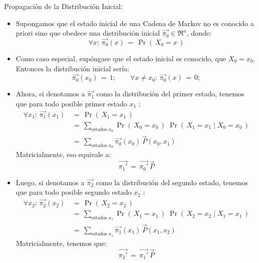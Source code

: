 \documentclass[ 10pt, xcolor = dvipsnames]{beamer}
\begin{document}
\begin{frame}[allowframebreaks]
\frametitle{\insertsubsection}

Propagaci\'on de la Distribuci\'on Inicial: 
\begin{itemize}
\item Supongamos que el estado inicial de una Cadena de Markov no es conocido \linebreak a priori sino que obedece una distribuci\'on inicial $\vec{\pi_0} \in \Re^n$, donde: 
\[
\forall x \colon \, \vec{\pi_0}(x) \, = \, \Pr( \, X_0 = x \, )
\]
\item Como caso especial, sup\'ongase que el estado inicial es conocido, \eg \linebreak que $X_0 = x_0$. Entonces la distribuci\'on inicial ser\'ia: 
\[
\vec{\pi_0}(x_0) \, = \, 1; \qquad
\forall x \neq x_0 \colon \, \vec{\pi_0}(x) \, = \, 0;
\]
\end{itemize}
\framebreak

\begin{itemize}
\item Ahora, si denotamos a $\vec{\pi_1}$ como la distribuci\'on del primer estado, \linebreak tenemos que para todo posible primer estado $x_1$ :
\begin{align*}
\forall x_1 \colon \, \vec{\pi_1}(x_1) \, 
& = \, \Pr( \, X_1 = x_1 \, ) \\[1ex]
& = \, \sum_{\text{estados } x_0} \Pr( \, X_0 = x_0 \, ) \; \Pr( \, X_1 = x_1 \mid X_0 = x_0 \, ) \\[1ex]
& = \, \sum_{\text{estados } x_0} \vec{\pi_0}(x_0) \, \vec{P}(x_0,x_1)
\end{align*}
Matricialmente, eso equivale a: 
\[
\vec{\pi_1'} \, = \, \vec{\pi_0'} \, \vec{P}
\]
\end{itemize}
\framebreak

\begin{itemize}
\item Luego, si denotamos a $\vec{\pi_2}$ como la distribuci\'on del segundo estado, \linebreak tenemos que para todo posible segundo estado $x_2$ :
\begin{align*}
\forall x_2 \colon \, \vec{\pi_2}(x_2) \,
& = \, \Pr( \, X_2 = x_2 \, ) \\[1ex]
& = \, \sum_{\text{estados } x_1} \Pr( \, X_1 = x_1 \, ) \; \Pr( \, X_2 = x_2 \mid X_1 = x_1 \, ) \\[1ex]
& = \, \sum_{\text{estados } x_1} \vec{\pi_1}(x_1) \, \vec{P}(x_1,x_2)
\end{align*}
Matricialmente, tenemos que: 
\[
\vec{\pi_2'} \, = \, \vec{\pi_1'} \, \vec{P}
\]
\end{itemize}
\framebreak


\end{frame}
\end{document}
